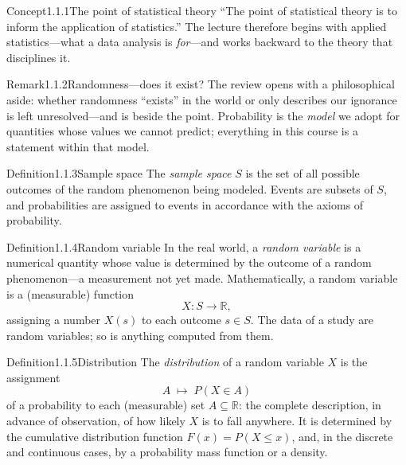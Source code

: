 \documentclass[main.tex]{subfiles}
\begin{document}
\clearpage

\begin{ObjL}{Concept}{1.1.1}{The point of statistical theory}
``The point of statistical theory is to inform the application of statistics.'' The lecture
therefore begins with applied statistics---what a data analysis is \emph{for}---and works
backward to the theory that disciplines it.
\end{ObjL}

\begin{ObjL}{Remark}{1.1.2}{Randomness---does it exist?}
The review opens with a philosophical aside: whether randomness ``exists'' in the world or only
describes our ignorance is left unresolved---and is beside the point. Probability is the
\emph{model} we adopt for quantities whose values we cannot predict; everything in this course
is a statement within that model.
\end{ObjL}

\begin{Obj}{Definition}{1.1.3}{Sample space}
The \emph{sample space} $S$ is the set of all possible outcomes of the random phenomenon being
modeled. Events are subsets of $S$, and probabilities are assigned to events in accordance with
the axioms of probability.
\end{Obj}

\begin{Obj}{Definition}{1.1.4}{Random variable}
In the real world, a \emph{random variable} is a numerical quantity whose value is determined
by the outcome of a random phenomenon---a measurement not yet made. Mathematically, a random
variable is a (measurable) function
\[ X : S \to \mathbb{R}, \]
assigning a number $X(s)$ to each outcome $s\in S$. The data of a study are random variables;
so is anything computed from them.
\end{Obj}

\begin{Obj}{Definition}{1.1.5}{Distribution}
The \emph{distribution} of a random variable $X$ is the assignment
\[ A \;\longmapsto\; P(X\in A) \]
of a probability to each (measurable) set $A\subseteq\mathbb{R}$: the complete description, in
advance of observation, of how likely $X$ is to fall anywhere. It is determined by the
cumulative distribution function $F(x)=P(X\le x)$, and, in the discrete and continuous cases,
by a probability mass function or a density.
\end{Obj}
\end{document}
